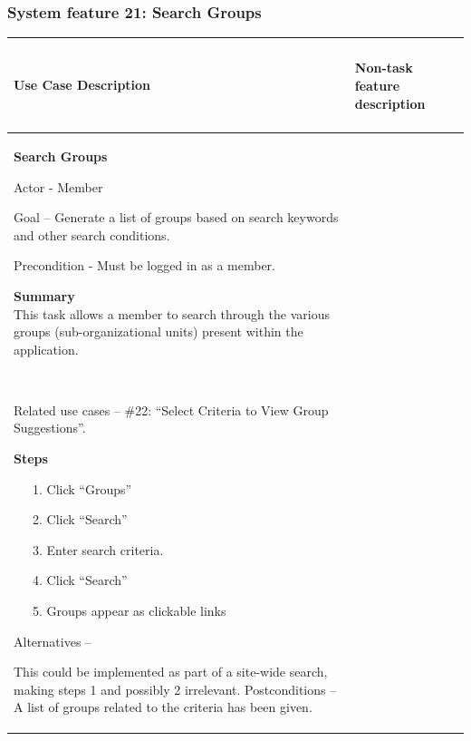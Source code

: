 \documentclass[letterpaper]{article}
\newcommand\textstyleDefaultParagraphFont[1]{#1}
\begin{document}
\subsubsection[System feature 21: Search Groups]{\rmfamily System
feature 21: Search Groups}
\begin{flushleft}
\tablehead{}
\begin{supertabular}{|m{3.17056in}|m{3.1712599in}|}
\hline
\bfseries\color{black} Use Case Description &
\paragraph[Non{}-task feature
description]{\rmfamily Non-task feature
description}
\\\hline
{\bfseries\color{black} Search Groups}

{\color{black} Actor - Member}

{\color{black} Goal -- Generate a list of groups based on search
keywords and other search conditions.}

{\color{black} Precondition - Must be logged in as a member.}

{\color{black} \textstyleDefaultParagraphFont{\textbf{Summary}}\newline
\textstyleDefaultParagraphFont{This task allows a member to search
through the various groups (sub-organizational units) present within
the application.}}

~

{\color{black} Related use cases -- \#22: {\textquotedblleft}Select
Criteria to View Group Suggestions{\textquotedblright}.}

{\color{black} \textstyleDefaultParagraphFont{\textbf{Steps}}}

{\color{black} \ \ \ 1. Click
{\textquotedblleft}Groups{\textquotedblright} }

{\color{black} \ \ \ 2. Click
{\textquotedblleft}Search{\textquotedblright} }

{\color{black} \ \ \ 3. Enter search criteria.}

{\color{black} \ \ \ 4. Click
{\textquotedblleft}Search{\textquotedblright}}

{\color{black} \ \ \ 5. Groups appear as clickable links}

{\color{black} Alternatives -- }

\color{black} This could be implemented as part of a site-wide search,
making steps 1 and possibly 2 irrelevant.\newline
Postconditions -- A list of groups related to the criteria has been
given. &

\end{supertabular}
\end{flushleft}
\end{document}
